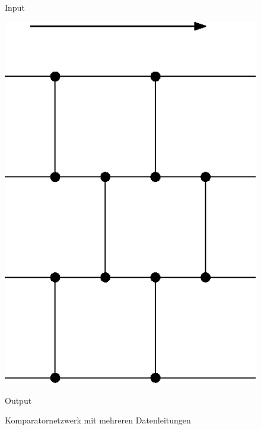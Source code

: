 \documentclass[11pt]{article}
\begin{document}
\begin{figure}
\begin{center}
\begin{minipage}[l]{2cm}
Input
\end{minipage}
\begin{minipage}[c]{7cm}
\begin{center}
    \includegraphics[scale=0.8]{bild2Komparatornetzwerk.eps}
\end{center}
\end{minipage}
\begin{minipage}[r]{2cm}
Output
\end{minipage}
\end{center}
\caption{Komparatornetzwerk mit mehreren Datenleitungen}
\label{fig:kompnetsmall}
\end{figure}
\end{document}
